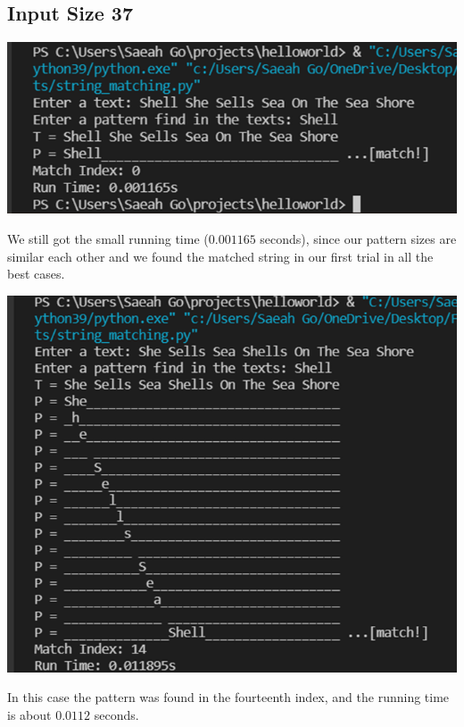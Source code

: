 \documentclass{article}
\begin{document}
\subsection{\textbf{Input Size 37}} 
\begin{center}
\includegraphics[scale = 0.7]{inputsize 37 best.png} \\
\end{center}
We still got the small running time ($0.001165$ seconds), since our pattern sizes are similar each other and we found the matched string in our first trial in all the best cases. 
\begin{center}
\includegraphics[scale = 0.67]{inputsize 37 average.png} \\
\end{center}
In this case the pattern was found in the fourteenth index, and the running time is about $0.0112$ seconds.
\end{document}
